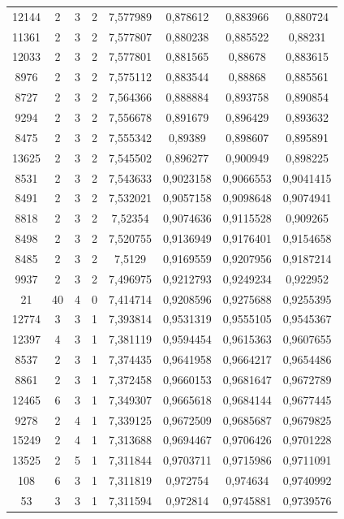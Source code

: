 \begin{longtable}{|c|c|c|c|c|c|c|c|}
12144 & 2 & 3 & 2 & 7,577989 & 0,878612 & 0,883966 & 0,880724 \\
11361 & 2 & 3 & 2 & 7,577807 & 0,880238 & 0,885522 & 0,88231 \\
12033 & 2 & 3 & 2 & 7,577801 & 0,881565 & 0,88678 & 0,883615 \\
8976 & 2 & 3 & 2 & 7,575112 & 0,883544 & 0,88868 & 0,885561 \\
8727 & 2 & 3 & 2 & 7,564366 & 0,888884 & 0,893758 & 0,890854 \\
9294 & 2 & 3 & 2 & 7,556678 & 0,891679 & 0,896429 & 0,893632 \\
8475 & 2 & 3 & 2 & 7,555342 & 0,89389 & 0,898607 & 0,895891 \\
13625 & 2 & 3 & 2 & 7,545502 & 0,896277 & 0,900949 & 0,898225 \\
8531 & 2 & 3 & 2 & 7,543633 & 0,9023158 & 0,9066553 & 0,9041415 \\
8491 & 2 & 3 & 2 & 7,532021 & 0,9057158 & 0,9098648 & 0,9074941 \\
8818 & 2 & 3 & 2 & 7,52354 & 0,9074636 & 0,9115528 & 0,909265 \\
8498 & 2 & 3 & 2 & 7,520755 & 0,9136949 & 0,9176401 & 0,9154658 \\
8485 & 2 & 3 & 2 & 7,5129 & 0,9169559 & 0,9207956 & 0,9187214 \\
9937 & 2 & 3 & 2 & 7,496975 & 0,9212793 & 0,9249234 & 0,922952 \\
21 & 40 & 4 & 0 & 7,414714 & 0,9208596 & 0,9275688 & 0,9255395 \\
12774 & 3 & 3 & 1 & 7,393814 & 0,9531319 & 0,9555105 & 0,9545367 \\
12397 & 4 & 3 & 1 & 7,381119 & 0,9594454 & 0,9615363 & 0,9607655 \\
8537 & 2 & 3 & 1 & 7,374435 & 0,9641958 & 0,9664217 & 0,9654486 \\
8861 & 2 & 3 & 1 & 7,372458 & 0,9660153 & 0,9681647 & 0,9672789 \\
12465 & 6 & 3 & 1 & 7,349307 & 0,9665618 & 0,9684144 & 0,9677445 \\
9278 & 2 & 4 & 1 & 7,339125 & 0,9672509 & 0,9685687 & 0,9679825 \\
15249 & 2 & 4 & 1 & 7,313688 & 0,9694467 & 0,9706426 & 0,9701228 \\
13525 & 2 & 5 & 1 & 7,311844 & 0,9703711 & 0,9715986 & 0,9711091 \\
108 & 6 & 3 & 1 & 7,311819 & 0,972754 & 0,974634 & 0,9740992 \\
53 & 3 & 3 & 1 & 7,311594 & 0,972814 & 0,9745881 & 0,9739576 \\

\end{longtable}
